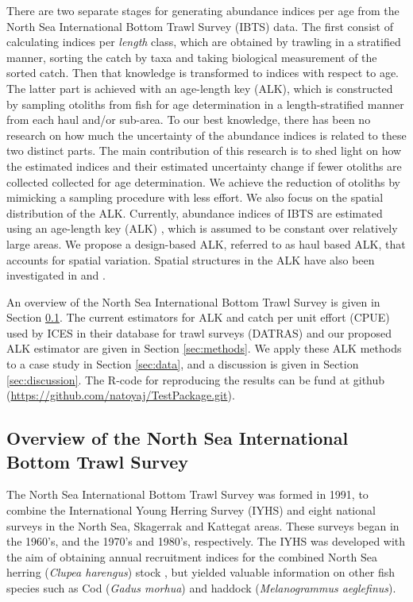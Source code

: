 \documentclass[a4paper 12pt]{article}
\numberwithin{equation}{section}
\begin{document}
There are two separate stages for generating abundance indices per age from the North Sea International Bottom Trawl Survey (IBTS) data.  The first consist of calculating indices per \textit{length} class, which are obtained by trawling in a stratified manner, sorting the catch by taxa and taking biological measurement of the sorted catch. Then that knowledge is transformed to indices with respect to age. The latter part is achieved with an age-length key (ALK), which is constructed by sampling otoliths from fish for age determination in a length-stratified manner from each haul and/or sub-area. To our best knowledge, there has been no research on how much the uncertainty of the abundance indices is related to these two distinct parts. The main contribution of this research is to shed light on how the estimated indices and their estimated uncertainty change if fewer otoliths are collected collected for age determination. We achieve the reduction of otoliths by mimicking a sampling procedure with less effort. We also focus on the spatial distribution of the ALK. Currently, abundance indices of IBTS are estimated using an age-length key (ALK) \citep{fridriksson1934calculation}, which is assumed to be constant over relatively large areas. We propose a design-based ALK, referred to as haul based ALK, that accounts for spatial variation. Spatial structures in the ALK have also been investigated in \citet{berg2012spatial} and  \citet{hirst2012bayesian}. 

An  overview of the  North Sea International Bottom Trawl Survey is given in Section \ref{overview}. The current estimators for ALK and catch per unit effort (CPUE) used by ICES in their database for trawl surveys (DATRAS) and our proposed ALK estimator are given in Section \ref{sec:methods}. We apply these ALK methods to a case study in Section  \ref{sec:data}, and a discussion is given in Section \ref{sec:discussion}. The R-code for reproducing the results can be fund at github (\href{https://github.com/natoyaj/TestPackage.git}{https://github.com/natoyaj/TestPackage.git}).
 

\subsection{Overview of the North Sea International Bottom Trawl Survey}
\label{overview}
\indent The North Sea International Bottom Trawl Survey was formed in 1991, to combine the International Young Herring Survey (IYHS) and eight national surveys in the North Sea, Skagerrak and Kattegat areas. These surveys began in the 1960's, and the 1970's and 1980's, respectively. The IYHS was developed with the aim of obtaining annual recruitment indices for the combined North Sea herring (\textit{Clupea harengus}) stock \citep{ICES2012}, but yielded valuable information on other fish species such as Cod (\textit{Gadus morhua}) and haddock (\textit{Melanogrammus aeglefinus}).
\end{document}
